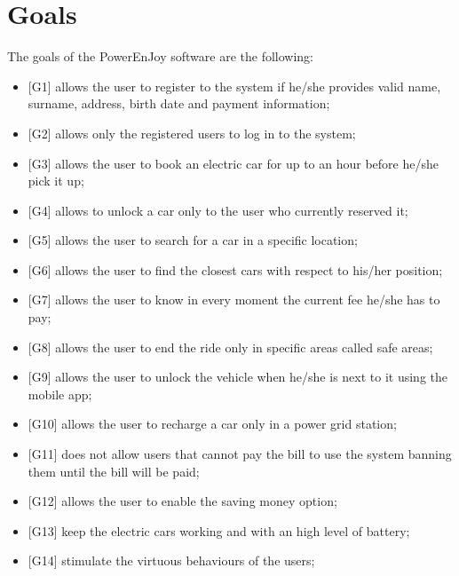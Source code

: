 \section{Goals}
The goals of the PowerEnJoy software are the following:
\begin{itemize}
    \item {[G1]} allows the user to register to the system if he/she provides valid name, surname, address, birth date and payment information;
    \item {[G2]} allows only the registered users to log in to the system;
	\item {[G3]} allows the user to book an electric car for up to an hour before he/she pick it up;
	\item {[G4]} allows to unlock a car only to the user who currently reserved it;
	\item {[G5]} allows the user to search for a car in a specific location; 
	\item {[G6]} allows the user to find the closest cars with respect to his/her position; 
	\item {[G7]} allows the user to know in every moment the current fee he/she has to pay;
	\item {[G8]} allows the user to end the ride only in specific areas called safe areas;
	\item {[G9]} allows the user to unlock the vehicle when he/she is next to it using the mobile app;
	\item {[G10]} allows the user to recharge a car only in a power grid station;
	\item {[G11]} does not allow users that cannot pay the bill to use the system banning them until the bill will be paid;
	\item {[G12]} allows the user to enable the saving money option;
	\item {[G13]} keep the electric cars working and with an high level of battery;
	\item {[G14]} stimulate  the virtuous behaviours of the users;
	
	
\end{itemize}

